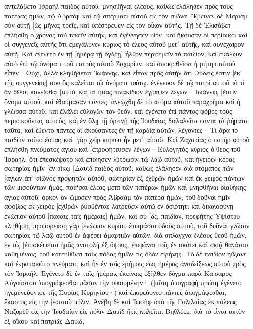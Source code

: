 ἀντελάβετο Ἰσραὴλ παιδὸς αὐτοῦ, μνησθῆναι ἐλέους, 
καθὼς ἐλάλησεν πρὸς τοὺς πατέρας ἡμῶν, τῷ Ἀβραὰμ καὶ τῷ σπέρματι αὐτοῦ εἰς τὸν αἰῶνα. 
Ἔμεινεν δὲ Μαριὰμ σὺν αὐτῇ [ὡς μῆνας τρεῖς, καὶ ὑπέστρεψεν εἰς τὸν οἶκον αὐτῆς. 
Τῇ δὲ Ἐλισάβετ ἐπλήσθη ὁ χρόνος τοῦ τεκεῖν αὐτήν, καὶ ἐγέννησεν υἱόν. 
καὶ ἤκουσαν οἱ περίοικοι καὶ οἱ συγγενεῖς αὐτῆς ὅτι ἐμεγάλυνεν κύριος τὸ ἔλεος αὐτοῦ μετ᾽ αὐτῆς, καὶ συνέχαιρον αὐτῇ. 
Καὶ ἐγένετο ἐν τῇ [ἡμέρᾳ τῇ ὀγδόῃ] ἦλθον περιτεμεῖν τὸ παιδίον, καὶ ἐκάλουν αὐτὸ ἐπὶ τῷ ὀνόματι τοῦ πατρὸς αὐτοῦ Ζαχαρίαν. 
καὶ ἀποκριθεῖσα ἡ μήτηρ αὐτοῦ εἶπεν· Οὐχί, ἀλλὰ κληθήσεται Ἰωάννης. 
καὶ εἶπαν πρὸς αὐτὴν ὅτι Οὐδείς ἐστιν [ἐκ τῆς συγγενείας] σου ὃς καλεῖται τῷ ὀνόματι τούτῳ. 
ἐνένευον δὲ τῷ πατρὶ αὐτοῦ τὸ τί ἂν θέλοι καλεῖσθαι [αὐτό. 
καὶ αἰτήσας πινακίδιον ἔγραψεν λέγων· Ἰωάννης [ἐστὶν ὄνομα αὐτοῦ. καὶ ἐθαύμασαν πάντες. 
ἀνεῴχθη δὲ τὸ στόμα αὐτοῦ παραχρῆμα καὶ ἡ γλῶσσα αὐτοῦ, καὶ ἐλάλει εὐλογῶν τὸν θεόν. 
καὶ ἐγένετο ἐπὶ πάντας φόβος τοὺς περιοικοῦντας αὐτούς, καὶ ἐν ὅλῃ τῇ ὀρεινῇ τῆς Ἰουδαίας διελαλεῖτο πάντα τὰ ῥήματα ταῦτα, 
καὶ ἔθεντο πάντες οἱ ἀκούσαντες ἐν τῇ καρδίᾳ αὐτῶν, λέγοντες· Τί ἄρα τὸ παιδίον τοῦτο ἔσται; καὶ [γὰρ χεὶρ κυρίου ἦν μετ᾽ αὐτοῦ. 
Καὶ Ζαχαρίας ὁ πατὴρ αὐτοῦ ἐπλήσθη πνεύματος ἁγίου καὶ [ἐπροφήτευσεν λέγων· 
Εὐλογητὸς κύριος ὁ θεὸς τοῦ Ἰσραήλ, ὅτι ἐπεσκέψατο καὶ ἐποίησεν λύτρωσιν τῷ λαῷ αὐτοῦ, 
καὶ ἤγειρεν κέρας σωτηρίας ἡμῖν [ἐν οἴκῳ [Δαυὶδ παιδὸς αὐτοῦ, 
καθὼς ἐλάλησεν διὰ στόματος τῶν [ἁγίων ἀπ᾽ αἰῶνος προφητῶν αὐτοῦ, 
σωτηρίαν ἐξ ἐχθρῶν ἡμῶν καὶ ἐκ χειρὸς πάντων τῶν μισούντων ἡμᾶς, 
ποιῆσαι ἔλεος μετὰ τῶν πατέρων ἡμῶν καὶ μνησθῆναι διαθήκης ἁγίας αὐτοῦ, 
ὅρκον ὃν ὤμοσεν πρὸς Ἀβραὰμ τὸν πατέρα ἡμῶν, τοῦ δοῦναι ἡμῖν 
ἀφόβως ἐκ χειρὸς [ἐχθρῶν ῥυσθέντας λατρεύειν αὐτῷ 
ἐν ὁσιότητι καὶ δικαιοσύνῃ ἐνώπιον αὐτοῦ [πάσαις ταῖς ἡμέραις] ἡμῶν. 
καὶ σὺ [δέ, παιδίον, προφήτης Ὑψίστου κληθήσῃ, προπορεύσῃ γὰρ [ἐνώπιον κυρίου ἑτοιμάσαι ὁδοὺς αὐτοῦ, 
τοῦ δοῦναι γνῶσιν σωτηρίας τῷ λαῷ αὐτοῦ ἐν ἀφέσει ἁμαρτιῶν αὐτῶν, 
διὰ σπλάγχνα ἐλέους θεοῦ ἡμῶν, ἐν οἷς [ἐπισκέψεται ἡμᾶς ἀνατολὴ ἐξ ὕψους, 
ἐπιφᾶναι τοῖς ἐν σκότει καὶ σκιᾷ θανάτου καθημένοις, τοῦ κατευθῦναι τοὺς πόδας ἡμῶν εἰς ὁδὸν εἰρήνης. 
Τὸ δὲ παιδίον ηὔξανε καὶ ἐκραταιοῦτο πνεύματι, καὶ ἦν ἐν ταῖς ἐρήμοις ἕως ἡμέρας ἀναδείξεως αὐτοῦ πρὸς τὸν Ἰσραήλ. 
Ἐγένετο δὲ ἐν ταῖς ἡμέραις ἐκείναις ἐξῆλθεν δόγμα παρὰ Καίσαρος Αὐγούστου ἀπογράφεσθαι πᾶσαν τὴν οἰκουμένην· 
([αὕτη ἀπογραφὴ πρώτη ἐγένετο ἡγεμονεύοντος τῆς Συρίας Κυρηνίου·) 
καὶ ἐπορεύοντο πάντες ἀπογράφεσθαι, ἕκαστος εἰς τὴν [ἑαυτοῦ πόλιν. 
Ἀνέβη δὲ καὶ Ἰωσὴφ ἀπὸ τῆς Γαλιλαίας ἐκ πόλεως Ναζαρὲθ εἰς τὴν Ἰουδαίαν εἰς πόλιν Δαυὶδ ἥτις καλεῖται Βηθλέεμ, διὰ τὸ εἶναι αὐτὸν ἐξ οἴκου καὶ πατριᾶς Δαυίδ, 
